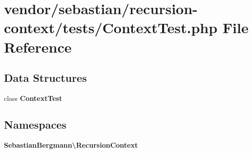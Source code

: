 \section{vendor/sebastian/recursion-\/context/tests/\+Context\+Test.php File Reference}
\label{_context_test_8php}
\subsection*{Data Structures}
\begin{DoxyCompactItemize}
\item 
class {\bf Context\+Test}
\end{DoxyCompactItemize}
\subsection*{Namespaces}
\begin{DoxyCompactItemize}
\item 
 {\bf Sebastian\+Bergmann\textbackslash{}\+Recursion\+Context}
\end{DoxyCompactItemize}
